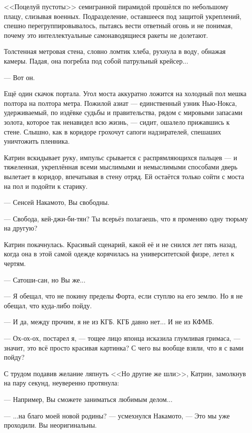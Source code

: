 <<Поцелуй пустоты>> семигранной пирамидой прошёлся по небольшому плацу, слизывая военных.
Подразделение, оставшееся под защитой укреплений, спешно перегруппировывалось,
пытаясь вести ответный огонь и не понимая, почему это интеллектуальные самонаводящиеся ракеты не долетают.

Толстенная метровая стена, словно ломтик хлеба, рухнула в воду, обнажая камеры. Падая, она погребла под собой патрульный крейсер...

\emptypar

--- Вот он.

Ещё один скачок портала. Угол моста аккуратно ложится на холодный пол мешка полтора на полтора метра.
Пожилой азиат --- единственный узник Нью-Нокса, удерживаемый, по издёвке судьбы и правительства, рядом с мировыми запасами золота,
которое так ненавидел всю жизнь, --- сидит, ошалело прижавшись к стене.
Слышно, как в коридоре грохочут сапоги надзирателей, спешаших уничтожить пленника.

Катрин вскидывает руку, импульс срывается с распрямляющихся пальцев ---
и тяжеленная, укреплённая всеми мыслимыми и немыслимыми способами дверь вылетает в коридор, впечатывая в стену отряд.
Ей остаётся только сойти с моста на пол и подойти к старику.

--- Сенсей Накамото, Вы свободны.

\emptypar

--- Свобода, кей-джи-би-тян? Ты всерьёз полагаешь, что я променяю одну тюрьму на другую?

Катрин покачнулась. Красивый сценарий, какой её и не снился лет пять назад,
когда она в этой самой одежде корячилась на университетской физре, летел к чертям.

--- Сатоши-сан, но Вы же...

--- Я обещал, что не покину пределы Форта, если ступлю на его землю. Но я не обещал, что куда-либо пойду.

--- И да, между прочим, я не из КГБ. КГБ давно нет... И не из КФМБ.

--- Ох-ох-ох, постарел я, --- тощее лицо японца исказила глумливая гримаса, --- значит, это всё просто красивая картинка?
С чего вы вообще взяли, что я с вами пойду?

С трудом подавив желание ляпнуть <<Но другие же шли>>, Катрин, замолкнув на пару секунд, неуверенно протянула:

--- Например, Вы сможете заниматься любимым делом...

--- ...на благо моей новой родины? --- усмехнулся Накамото, --- Это мы уже проходили. Вы неоригинальны.

